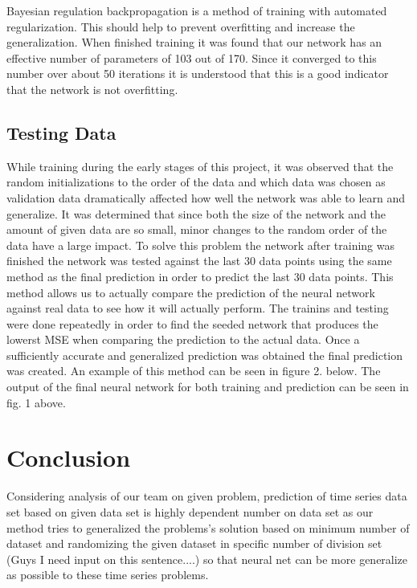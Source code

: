 \documentclass[conference]{IEEEtran}
\begin{document}
Bayesian regulation backpropagation is a method of training with automated regularization. This should help to prevent overfitting and increase the generalization. When finished training it was found that our network has an effective number of parameters of 103 out of 170. Since it converged to this number over about 50 iterations it is understood that this is a good indicator that the network is not overfitting. 



\subsection{Testing Data}
While training during the early stages of this project, it was observed that the random initializations to the order of the data and which data was chosen as validation data dramatically affected how well the network was able to learn and generalize. It was determined that since both the size of the network and the amount of given data are so small, minor changes to the random order of the data have a large impact. To solve this problem the network after training was finished the network was tested against the last 30 data points using the same method as the final prediction in order to predict the last 30 data points. This method allows us to actually compare the prediction of the neural network against real data to see how it will actually perform. The trainins and testing were done repeatedly in order to find the seeded network that produces the lowerst MSE when comparing the prediction to the actual data. Once a sufficiently accurate and generalized prediction was obtained the final prediction was created. An example of this method can be seen in figure 2. below. The output of the final neural network for both training and prediction can be seen in fig. 1 above.




\section{Conclusion}
Considering analysis of our team on given problem, prediction of time series data set based on given data set is highly dependent  number on data set as our method tries to generalized the problems's solution based on minimum number of dataset and randomizing the given dataset in specific number of division set (Guys I need input on this sentence....) so that neural net can be more generalize  as possible to these time series problems.

\begin{IEEEbiography}


\end{IEEEbiography}
\end{document}
